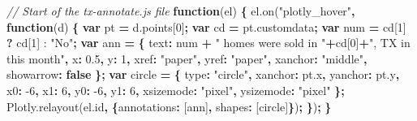 \documentclass[
  12pt,
]{krantz}
\newenvironment{Shaded}{\begin{snugshade}}{\end{snugshade}}
\newcommand{\AttributeTok}[1]{\textcolor[rgb]{0.77,0.63,0.00}{#1}}
\newcommand{\CommentTok}[1]{\textcolor[rgb]{0.56,0.35,0.01}{\textit{#1}}}
\newcommand{\DataTypeTok}[1]{\textcolor[rgb]{0.13,0.29,0.53}{#1}}
\newcommand{\DecValTok}[1]{\textcolor[rgb]{0.00,0.00,0.81}{#1}}
\newcommand{\FloatTok}[1]{\textcolor[rgb]{0.00,0.00,0.81}{#1}}
\newcommand{\KeywordTok}[1]{\textcolor[rgb]{0.13,0.29,0.53}{\textbf{#1}}}
\newcommand{\NormalTok}[1]{#1}
\newcommand{\OperatorTok}[1]{\textcolor[rgb]{0.81,0.36,0.00}{\textbf{#1}}}
\newcommand{\StringTok}[1]{\textcolor[rgb]{0.31,0.60,0.02}{#1}}
\newcommand{\VariableTok}[1]{\textcolor[rgb]{0.00,0.00,0.00}{#1}}
\begin{document}
\begin{Shaded}
\begin{Highlighting}[]
\CommentTok{// Start of the tx-annotate.js file}
\KeywordTok{function}\NormalTok{(el) }\OperatorTok{\{}
  \VariableTok{el}\NormalTok{.}\AttributeTok{on}\NormalTok{(}\StringTok{"plotly_hover"}\OperatorTok{,} \KeywordTok{function}\NormalTok{(d) }\OperatorTok{\{}
    \KeywordTok{var}\NormalTok{ pt }\OperatorTok{=} \VariableTok{d}\NormalTok{.}\AttributeTok{points}\NormalTok{[}\DecValTok{0}\NormalTok{]}\OperatorTok{;}
    \KeywordTok{var}\NormalTok{ cd }\OperatorTok{=} \VariableTok{pt}\NormalTok{.}\AttributeTok{customdata}\OperatorTok{;}
    \KeywordTok{var}\NormalTok{ num }\OperatorTok{=}\NormalTok{ cd[}\DecValTok{1}\NormalTok{] }\OperatorTok{?}\NormalTok{ cd[}\DecValTok{1}\NormalTok{] : }\StringTok{"No"}\OperatorTok{;}
    \KeywordTok{var}\NormalTok{ ann }\OperatorTok{=} \OperatorTok{\{}
      \DataTypeTok{text}\OperatorTok{:}\NormalTok{ num }\OperatorTok{+} \StringTok{" homes were sold in "}\OperatorTok{+}\NormalTok{cd[}\DecValTok{0}\NormalTok{]}\OperatorTok{+}\StringTok{", TX in this month"}\OperatorTok{,}
      \DataTypeTok{x}\OperatorTok{:} \FloatTok{0.5}\OperatorTok{,}
      \DataTypeTok{y}\OperatorTok{:} \DecValTok{1}\OperatorTok{,}
      \DataTypeTok{xref}\OperatorTok{:} \StringTok{"paper"}\OperatorTok{,}
      \DataTypeTok{yref}\OperatorTok{:} \StringTok{"paper"}\OperatorTok{,}
      \DataTypeTok{xanchor}\OperatorTok{:} \StringTok{"middle"}\OperatorTok{,}
      \DataTypeTok{showarrow}\OperatorTok{:} \KeywordTok{false}
    \OperatorTok{\};}
    \KeywordTok{var}\NormalTok{ circle }\OperatorTok{=} \OperatorTok{\{}
      \DataTypeTok{type}\OperatorTok{:} \StringTok{"circle"}\OperatorTok{,}
      \DataTypeTok{xanchor}\OperatorTok{:} \VariableTok{pt}\NormalTok{.}\AttributeTok{x}\OperatorTok{,}
      \DataTypeTok{yanchor}\OperatorTok{:} \VariableTok{pt}\NormalTok{.}\AttributeTok{y}\OperatorTok{,}
      \DataTypeTok{x0}\OperatorTok{:} \DecValTok{-6}\OperatorTok{,}
      \DataTypeTok{x1}\OperatorTok{:} \DecValTok{6}\OperatorTok{,}
      \DataTypeTok{y0}\OperatorTok{:} \DecValTok{-6}\OperatorTok{,}
      \DataTypeTok{y1}\OperatorTok{:} \DecValTok{6}\OperatorTok{,}
      \DataTypeTok{xsizemode}\OperatorTok{:} \StringTok{"pixel"}\OperatorTok{,}
      \DataTypeTok{ysizemode}\OperatorTok{:} \StringTok{"pixel"}
    \OperatorTok{\};}
    \VariableTok{Plotly}\NormalTok{.}\AttributeTok{relayout}\NormalTok{(}\VariableTok{el}\NormalTok{.}\AttributeTok{id}\OperatorTok{,} \OperatorTok{\{}\DataTypeTok{annotations}\OperatorTok{:}\NormalTok{ [ann]}\OperatorTok{,} \DataTypeTok{shapes}\OperatorTok{:}\NormalTok{ [circle]}\OperatorTok{\}}\NormalTok{)}\OperatorTok{;}
  \OperatorTok{\}}\NormalTok{)}\OperatorTok{;}
\OperatorTok{\}}
\end{Highlighting}
\end{Shaded}
\end{document}
